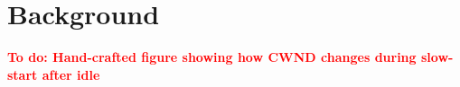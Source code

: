 \documentclass[10pt,sigconf,anonymous]{acmart}
\newcommand{\todo}[1]{\textbf{\textcolor{red}{To do: #1}}}
\begin{document}


\section{Background}
\label{sec:background}

\todo{Hand-crafted figure showing how CWND changes during slow-start after idle}


\end{document}
